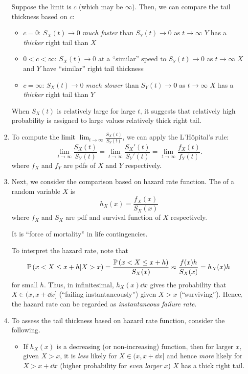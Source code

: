 \begin{enumerate}
Suppose the limit is \(c\) (which may be \(\infty\)). Then, we can compare the
tail thickness based on \(c\):
\begin{itemize}
\item \(c=0\): \(S_X(t)\to 0\) \emph{much faster} than \(S_Y(t)\to 0\) as \(t\to\infty\)
 \(Y\) has a \emph{thicker} right tail than \(X\)
\item \(0<c<\infty\): \(S_X(t)\to 0\) at a ``similar'' speed to \(S_Y(t)\to 0\)
as \(t\to\infty\)  \(X\) and \(Y\) have ``similar'' right
tail thickness
\item \(c=\infty\): \(S_X(t)\to 0\) \emph{much slower} than \(S_Y(t)\to 0\) as \(t\to\infty\)
 \(X\) has a \emph{thicker} right tail than \(Y\)
\end{itemize}
\begin{note}
When \(S_X(t)\) is relatively large for large \(t\), it suggests that
relatively high probability is assigned to large values 
relatively thick right tail.
\end{note}

\item \label{it:lim-surv-ratio-equal-lim-pdf-ratio}
To compute the limit \(\displaystyle \lim_{t\to \infty}\frac{S_X(t)}{S_Y(t)}
\), we can apply the L'H\^{o}pital's rule:
\[
\lim_{t\to \infty}\frac{S_X(t)}{S_Y(t)}
=\lim_{t\to \infty}\frac{S_X'(t)}{S_Y'(t)}
=\boxed{\lim_{t\to \infty}\frac{f_X(t)}{f_Y(t)}}.
\]
where \(f_X\) and \(f_Y\) are pdfs of \(X\) and \(Y\) respectively.

\item Next, we consider the comparison based on hazard rate
function. The  of a random variable \(X\) is
\[
h_X(x)=\frac{f_X(x)}{S_X(x)}
\]
where \(f_X\) and \(S_X\) are pdf and survival function of \(X\) respectively.

\begin{note}
It is ``force of mortality'' in life contingencies.
\end{note}

To interpret the hazard rate, note that
\[
\mathbb{P}\left(x<X\le x+h|X>x\right)=\frac{\mathbb{P}\left(x<X\le x+h\right)}{S_X(x)}
\approx\frac{f(x)h}{S_X(x)}=h_X(x)h
\]
for small \(h\). Thus, in infinitesimal, \(h_X(x)\dd{x}\) gives the probability
that \(X\in(x,x+\dd{x}]\) (``failing instantaneously'') given \(X>x\) (``surviving'').
Hence, the hazard rate can be regarded as \emph{instantaneous failure rate}.

\item To assess the tail thickness based on hazard rate function, consider the
following.
\begin{itemize}
\item If \(h_X(x)\) is a decreasing (or non-increasing) function, then for
larger \(x\), given \(X>x\), it is \emph{less} likely for \(X\in(x,x+\dd{x}]\)
and hence \emph{more} likely for \(X>x+\dd{x}\) (higher probability for
\emph{even larger} \(x\))  \(X\) has a thick right tail.


\end{itemize}
\end{enumerate}
